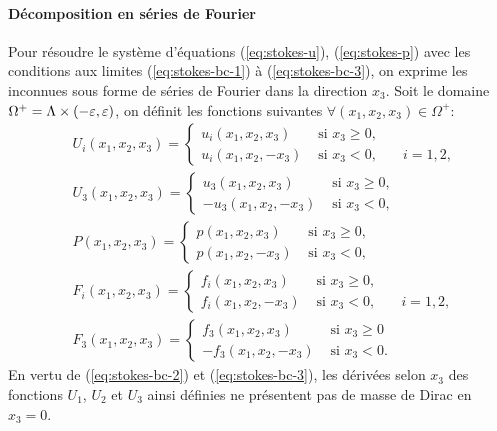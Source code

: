 \paragraph{Décomposition en séries de Fourier}
Pour résoudre le système d'équations (\ref{eq:stokes-u}),
(\ref{eq:stokes-p}) avec les conditions aux limites (\ref{eq:stokes-bc-1}) à
(\ref{eq:stokes-bc-3}), on exprime les inconnues sous forme de séries
de Fourier dans la direction $x_3$. Soit le domaine $\Omega^+ = \Lambda
\times (-\varepsilon, \varepsilon)$, on définit les fonctions suivantes
$\forall (x_1, x_2, x_3)\in \Omega^+$:
\begin{align}
  & U_i(x_1, x_2, x_3) = \left\{
    \begin{array}{lll}
      u_i(x_1, x_2, x_3) &\text{ si } x_3 \geq 0,\\
      u_i(x_1, x_2, -x_3) &\text{ si } x_3 < 0,     & \quad i = 1,2,
    \end{array}
  \right.\\
  & U_3(x_1, x_2, x_3) = \left\{
    \begin{array}{ll}
       u_3(x_1, x_2, x_3) &\text{ si } x_3 \geq 0,\\
      -u_3(x_1, x_2, -x_3) &\text{ si } x_3 < 0,
    \end{array}
  \right.\\
  & P(x_1, x_2, x_3) = \left\{
    \begin{array}{ll}
      p(x_1, x_2, x_3) &\text{ si } x_3 \geq 0,\\
      p(x_1, x_2, -x_3) &\text{ si } x_3 < 0,
    \end{array}
  \right.\\
  & F_i(x_1, x_2, x_3) = \left\{
    \begin{array}{lll}
      f_i(x_1, x_2, x_3) &\text{ si } x_3 \geq 0,\\
      f_i(x_1, x_2, -x_3) &\text{ si } x_3 < 0,     & \quad i = 1,2,
    \end{array}
  \right.\\
  & F_3(x_1, x_2, x_3) = \left\{
    \begin{array}{ll}
      f_3(x_1, x_2, x_3) &\text{ si } x_3 \geq 0\\
     -f_3(x_1, x_2, -x_3) &\text{ si } x_3 < 0.
    \end{array}
  \right.
\end{align}
En vertu de (\ref{eq:stokes-bc-2}) et (\ref{eq:stokes-bc-3}), les
dérivées selon $x_3$ des fonctions $U_1$, $U_2$ et $U_3$ ainsi définies ne
présentent pas de masse de Dirac en $x_3 = 0$.

